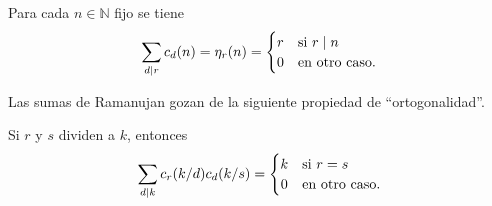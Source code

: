 \begin{corollary}\label{cor:ram5}
Para cada $n \in \mathbb{N}$ fijo se tiene
\begin{equation*}
    \sum_{d \mid r} c_d(n) = \eta_r(n) = \begin{cases}
        \hfil r & \text{si } r \mid n \\
        \hfil 0 & \text{en otro caso}.
    \end{cases}
\end{equation*}
\end{corollary}

Las sumas de Ramanujan gozan de la siguiente propiedad de ``ortogonalidad''.

\begin{lemma}\label{lem:ram4}
Si $r$ y $s$ dividen a $k$, entonces
\begin{equation*}
    \sum_{d \mid k} c_r(k/d) c_d(k/s) = \begin{cases}
        \hfil k & \text{si } r = s \\
        \hfil 0 & \text{en otro caso}.
    \end{cases}
\end{equation*}
\end{lemma}
